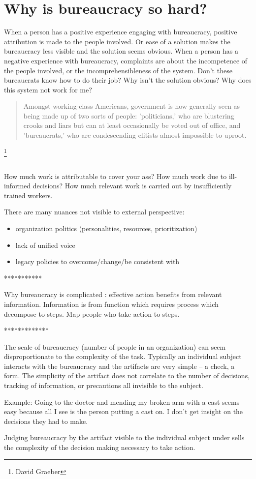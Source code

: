 \section{Why is bureaucracy so hard?}



When a person has a positive experience engaging with bureaucracy, positive attribution is made to the people involved. Or ease of a solution makes the bureaucracy less visible and the solution seems obvious. 
When a person has a negative experience with bureaucracy, complaints are about the incompetence of the people involved, or the incomprehensibleness of the system. Don't these bureaucrats know how to do their job? Why isn't the solution obvious? Why does this system not work for me?

\begin{quote}
 Amongst working-class Americans, government is now generally seen as being made up of two sorts of people: 'politicians,' who are blustering crooks and liars but can at least occasionally be voted out of office, and 'bureaucrats,' who are condescending elitists almost impossible to uproot.   
\end{quote}
\footnote{David Graeber}


\ \\


How much work is attributable to cover your ass? How much work due to ill-informed decisions? How much relevant work is carried out by insufficiently trained workers. 


There are many nuances not visible to external perspective:
\begin{itemize}
\item organization politics (personalities, resources, prioritization)
\item lack of unified voice
\item legacy policies to overcome/change/be consistent with
\end{itemize}

***********

Why bureaucracy is complicated : effective action benefits from relevant information. Information is from function which requires process which decompose to steps. Map people who take action to steps.

*************

The scale of bureaucracy (number of people in an organization) can seem disproportionate to the complexity of the task. Typically an individual subject interacts with the bureaucracy and the artifacts are very simple -- a check, a form. The simplicity of the artifact does not correlate to the number of decisions, tracking of information, or precautions all invisible to the subject.

Example: Going to the doctor and mending my broken arm with a cast seems easy because all I see is the person putting a cast on. I don't get insight on the decisions they had to make. 

Judging bureaucracy by the artifact visible to the individual subject under sells the complexity of the decision making necessary to take action.